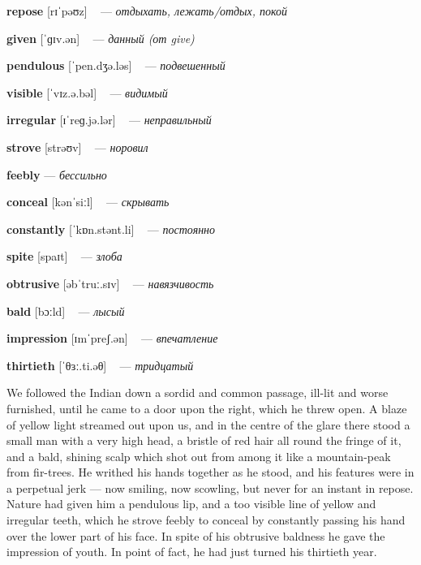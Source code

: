 \documentclass[a4paper,oneside,12pt]{amsart}
\begin{document}
{{\bf repose } [rɪˈpəʊz] ~ --- \emph{ отдыхать, лежать/отдых, покой }

{\bf given } [ˈɡɪv.ən] ~ --- \emph{ данный (от give) }

{\bf pendulous } [ˈpen.dʒə.ləs] ~ --- \emph{ подвешенный }

{\bf visible } [ˈvɪz.ə.bəl] ~ --- \emph{ видимый }

{\bf irregular } [ɪˈreɡ.jə.lər] ~ --- \emph{ неправильный }

{\bf strove } [strəʊv] ~ --- \emph{ норовил }

{\bf feebly } --- \emph{ бессильно }

{\bf conceal } [kənˈsiːl] ~ --- \emph{ скрывать }

{\bf constantly } [ˈkɒn.stənt.li] ~ --- \emph{ постоянно }

{\bf spite } [spaɪt] ~ --- \emph{ злоба }

{\bf obtrusive } [əbˈtruː.sɪv] ~ --- \emph{ навязчивость }

{\bf bald } [bɔːld] ~ --- \emph{ лысый }

{\bf impression } [ɪmˈpreʃ.ən] ~ --- \emph{ впечатление }

{\bf thirtieth } [ˈθɜː.ti.əθ] ~ --- \emph{ тридцатый }

} \vspace{6mm} {\Large 

We followed the Indian down a sordid and common passage, ill-lit and worse furnished, until he came to a door upon the right, which he threw open. A blaze of yellow light streamed out upon us, and in the centre of the glare there stood a small man with a very high head, a bristle of red hair all round the fringe of it, and a bald, shining scalp which shot out from among it like a mountain-peak from fir-trees. He writhed his hands together as he stood, and his features were in a perpetual jerk --- now smiling, now scowling, but never for an instant in repose. Nature had given him a pendulous lip, and a too visible line of yellow and irregular teeth, which he strove feebly to conceal by constantly passing his hand over the lower part of his face. In spite of his obtrusive baldness he gave the impression of youth. In point of fact, he had just turned his thirtieth year.
\\ } 
\end{document}
